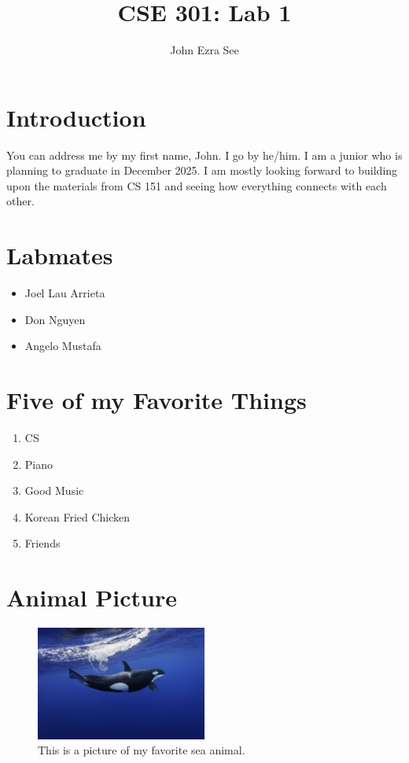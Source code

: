 \documentclass[11pt]{article}
\title{CSE 301: Lab 1}
\author{John Ezra See} %
\begin{document}
\maketitle
\section*{Introduction}
    You can address me by my first name, John. I go by he/him. I am a junior who is planning to graduate in December 2025. I am mostly looking forward to building upon the materials from CS 151 and seeing how everything connects with each other.
\hspace{10 cm}

\section*{Labmates}
\begin{itemize}
    \item Joel Lau Arrieta
    \item Don Nguyen
    \item Angelo Mustafa
\end{itemize}
\hspace{10 cm}

\section*{Five of my Favorite Things}
\begin{enumerate}
    \item CS \\
    \item Piano \\
    \item Good Music \\
    \item Korean Fried Chicken \\
    \item Friends \\
\end{enumerate}
\hspace{10 cm}

\section* {Animal Picture}
\begin{figure}[ht]
\centering 
\includegraphics[width=0.5\textwidth, height=0.2\textheight, keepaspectratio, origin=c]{orca.jpg}
\caption{This is a picture of my favorite sea animal.}
\end{figure}
\end{document}

